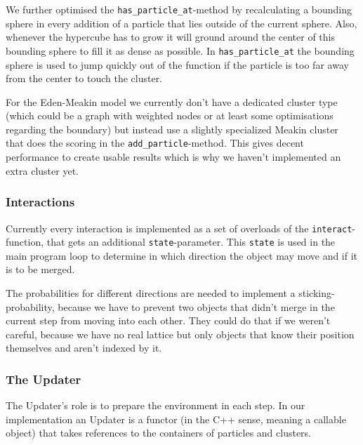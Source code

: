 \documentclass[twocolumn,10pt]{scrartcl}
\begin{document}
                We further optimised the \lstinline'has_particle_at'-method by recalculating a bounding sphere in every
                addition of a particle that lies outside of the current sphere. Also, whenever the hypercube has to grow
                it will ground around the center of this bounding sphere to fill it as dense as possible. In
                \lstinline'has_particle_at' the bounding sphere is used to jump quickly out of the function if the
                particle is too far away from the center to touch the cluster.

                For the Eden-Meakin model we currently don't have a dedicated cluster type (which could be a graph with
                weighted nodes or at least some optimisations regarding the boundary) but instead use a slightly
                specialized Meakin cluster that does the scoring in the \lstinline'add_particle'-method. This gives
                decent performance to create usable results which is why we haven't implemented an extra cluster yet.

            \subsubsection{Interactions}
                Currently every interaction is implemented as a set of overloads of the \lstinline'interact'-function,
                that gets an additional \lstinline'state'-parameter. This \lstinline'state' is used in the main program
                loop to determine in which direction the object may move and if it is to be merged.

                The probabilities for different directions are needed to implement a sticking-probability, because we
                have to prevent two objects that didn't merge in the current step from moving into each other. They
                could do that if we weren't careful, because we have no real lattice but only objects that know their
                position themselves and aren't indexed by it.

            \subsubsection{The Updater}
                The Updater's role is to prepare the environment in each step. In our implementation an Updater is a
                functor (in the C++ sense, meaning a callable object) that takes references to the containers of
                particles and clusters.
\end{document}

